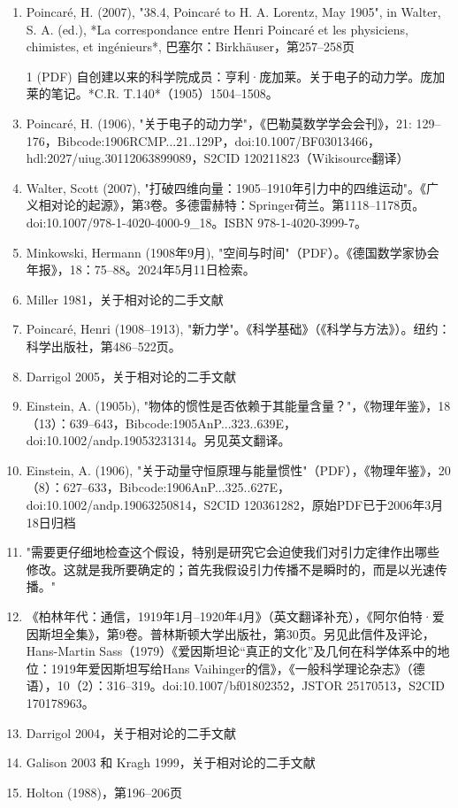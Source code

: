 \begin{enumerate}
\item Poincaré, H. (2007), "38.4, Poincaré to H. A. Lorentz, May 1905", in Walter, S. A. (ed.), *La correspondance entre Henri Poincaré et les physiciens, chimistes, et ingénieurs*, 巴塞尔：Birkhäuser，第257–258页
\item [1] (PDF) 自创建以来的科学院成员：亨利·庞加莱。关于电子的动力学。庞加莱的笔记。*C.R. T.140*（1905）1504–1508。
\item Poincaré, H. (1906), "关于电子的动力学"，《巴勒莫数学学会会刊》，21: 129–176，Bibcode:1906RCMP...21..129P，doi:10.1007/BF03013466，hdl:2027/uiug.30112063899089，S2CID 120211823（Wikisource翻译）
\item Walter, Scott (2007), "打破四维向量：1905–1910年引力中的四维运动"。《广义相对论的起源》，第3卷。多德雷赫特：Springer荷兰。第1118–1178页。doi:10.1007/978-1-4020-4000-9_18。ISBN 978-1-4020-3999-7。
\item Minkowski, Hermann (1908年9月), "空间与时间"（PDF）。《德国数学家协会年报》，18：75–88。2024年5月11日检索。
\item Miller 1981，关于相对论的二手文献
\item Poincaré, Henri (1908–1913), "新力学"。《科学基础》（《科学与方法》）。纽约：科学出版社，第486–522页。
\item Darrigol 2005，关于相对论的二手文献
\item Einstein, A. (1905b), "物体的惯性是否依赖于其能量含量？"，《物理年鉴》，18（13）：639–643，Bibcode:1905AnP...323..639E，doi:10.1002/andp.19053231314。另见英文翻译。
\item Einstein, A. (1906), "关于动量守恒原理与能量惯性"（PDF），《物理年鉴》，20（8）：627–633，Bibcode:1906AnP...325..627E，doi:10.1002/andp.19063250814，S2CID 120361282，原始PDF已于2006年3月18日归档
\item "需要更仔细地检查这个假设，特别是研究它会迫使我们对引力定律作出哪些修改。这就是我所要确定的；首先我假设引力传播不是瞬时的，而是以光速传播。"
\item 《柏林年代：通信，1919年1月–1920年4月》（英文翻译补充），《阿尔伯特·爱因斯坦全集》，第9卷。普林斯顿大学出版社，第30页。另见此信件及评论，Hans-Martin Sass（1979）《爱因斯坦论“真正的文化”及几何在科学体系中的地位：1919年爱因斯坦写给Hans Vaihinger的信》，《一般科学理论杂志》（德语），10（2）：316–319。doi:10.1007/bf01802352，JSTOR 25170513，S2CID 170178963。
\item Darrigol 2004，关于相对论的二手文献
\item Galison 2003 和 Kragh 1999，关于相对论的二手文献
\item Holton (1988)，第196–206页

\end{enumerate}
